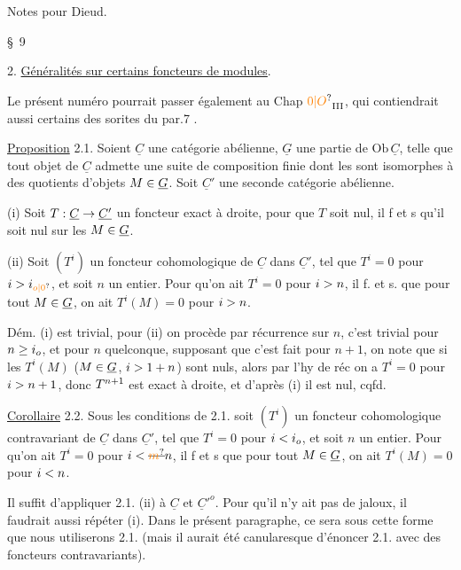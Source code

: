 Notes pour Dieud.

\S~9

2. \uline{Généralités sur certains foncteurs de modules}.

Le présent numéro pourrait passer également au  Chap $\unsure{0|O}_{\mathrm{III}}$, qui contiendrait aussi certains des sorites du par.7 .

\uline{Proposition} 2.1. Soient $\underline C$ une catégorie abélienne, $\underline G$ une partie de $\mathrm{Ob}\,\underline C$, telle que tout objet de $\underline C$ admette une suite de composition finie dont les  sont isomorphes à des quotients d'objets $M\in\underline G$.  Soit $\underline C'$ une seconde catégorie abélienne.

(i) Soit $T:\underline C\to\underline{C'}$ un foncteur  exact à droite, pour que $T$ soit nul, il f et s qu'il soit nul sur les $M\in\underline G$.

(ii) Soit $(T^i)$ un foncteur cohomologique de $\underline C$ dans $\underline C'$, tel que $T^i=0$ pour $i\handwritten{>}i_{\unsure{o|0}}$, et soit $n$ un entier. Pour qu'on ait $T^i=0$ pour $i>n$, il f. et s. que pour tout $M\in\underline G$, on ait $T^i(M)=0$ pour $i>n$.

Dém. (i) est trivial, pour (ii) on procède par récurrence  sur $n$, c'est trivial pour $n\geq i_o$, et pour $n$ quelconque, supposant que c'est fait pour $n+1$, on note que si les $T^i(M)$ ($M\in\underline G$, $i>1+n$) sont nuls, alors par l'hy de réc on a $T^i=0$ pour $i>n+1$, donc $T^{n+1}$ est exact à droite, et d'après (i) il est nul, cqfd.

\uline{Corollaire} 2.2. Sous les conditions de 2.1. soit $(T^i)$ un foncteur cohomologique contravariant de $\underline C$ dans $\underline C'$, tel que $T^i=0$ pour $i<i_o$, et soit $n$ un entier. Pour qu'on ait $T^i=0$ pour $i\handwritten{<}\deleted{\unsure{m}}\handwritten{n}$, il f et s que pour tout $M\in\underline G$, on ait $T^i(M)=0$ pour $i<n$.

Il suffit d'appliquer 2.1. (ii) à $\underline C$ et ${\underline C'}^{o}$. Pour qu'il n'y ait pas de jaloux, il faudrait aussi répéter (i). Dans le présent paragraphe, ce sera sous cette forme que nous utiliserons 2.1. (mais il aurait été canularesque d'énoncer 2.1. avec des foncteurs contravariants).

